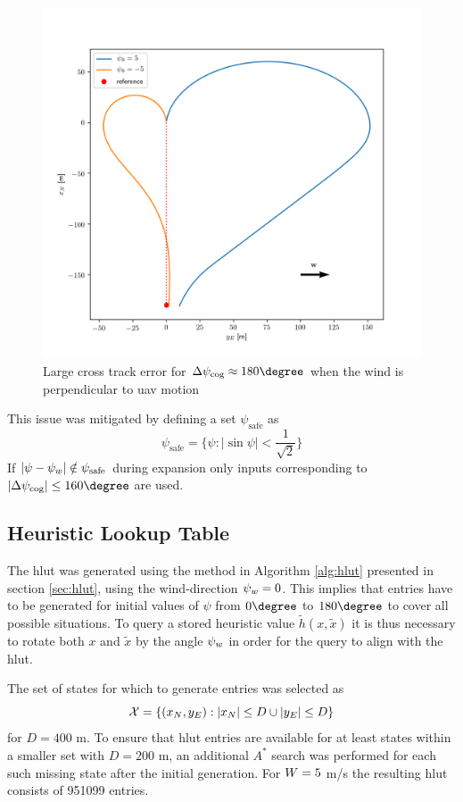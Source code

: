 \begin{figure}
    \begin{center}
        \includegraphics[width=.7\linewidth]{fig/prim_diff_hdg}        
    \end{center}
    \caption{Large cross track error for $\Delta\cog\approx180\degree$ when the wind is perpendicular to \ac{uav} motion}
    \label{fig:hdg_diff_wind}
\end{figure}

This issue was mitigated by defining a set $\psi_{\text{safe}}$ as 
\begin{equation}
    \psi_{\text{safe}}=\{\psi: |\sin\psi|<\frac{1}{\sqrt{2}}\}
\end{equation}
If $|\psi-\psi_w|\notin\psi_{\text{safe}}$ during expansion only inputs corresponding to $|\Delta\cog|\leq160\degree$ are used.

\subsection{Heuristic Lookup Table}
The \ac{hlut} was generated using the method in Algorithm \ref{alg:hlut} presented in section \ref{sec:hlut}, using the wind-direction $\psi_w=0$. This implies that 
entries have to be generated for initial values of $\psi$ from $0\degree$ to $180\degree$ to cover all possible situations. To query a stored heuristic value $\tilde{h}(x, \tilde{x})$ it is 
thus necessary to rotate both $x$ and $\tilde{x}$ by the angle $\psi_w$ in order for the query to align with the \ac{hlut}. 

The set of states for which to generate entries was selected as 
\begin{equation}
    \mathcal{X}=\{(x_N,y_E): |x_N|\leq D \cup |y_E| \leq D\}
\end{equation}
for $D=400$ m. To ensure that \ac{hlut} entries are available for at least states within a smaller set with $D=200$ m, an additional 
$A^*$ search was performed for each such missing state after the initial generation. For $W=5$ m/s the resulting \ac{hlut} consists of 951099 entries.

